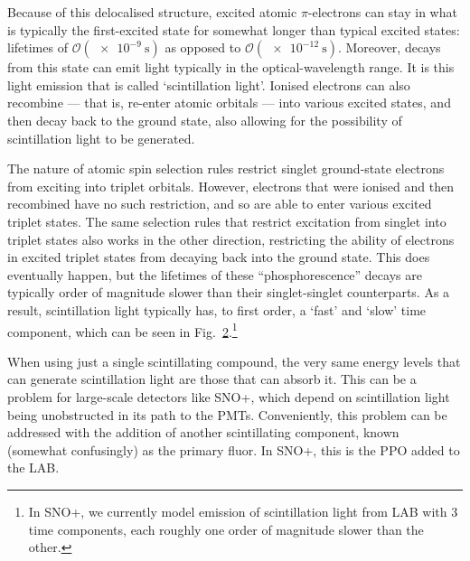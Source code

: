 \begin{figure}
    \centering
    \caption[]{}
    \label{fig:benzene_pi_bonds}
\end{figure}

Because of this delocalised structure, excited atomic $\pi$-electrons can stay in what is typically the first-excited state for somewhat longer than typical excited states: lifetimes of $\mathcal{O}(\SI{e-9}{\second})$ as opposed to $\mathcal{O}(\SI{e-12}{\second})$. Moreover, decays from this state can emit light typically in the optical-wavelength range. It is this light emission that is called `scintillation light'. Ionised electrons can also recombine --- that is, re-enter atomic orbitals --- into various excited states, and then decay back to the ground state, also allowing for the possibility of scintillation light to be generated.

The nature of atomic spin selection rules restrict singlet ground-state electrons from exciting into triplet orbitals. However, electrons that were ionised and then recombined have no such restriction, and so are able to enter various excited triplet states. The same selection rules that restrict excitation from singlet into triplet states also works in the other direction, restricting the ability of electrons in excited triplet states from decaying back into the ground state. This does eventually happen, but the lifetimes of these ``phosphorescence'' decays are typically order of magnitude slower than their singlet-singlet counterparts. As a result, scintillation light typically has, to first order, a `fast' and `slow' time component, which can be seen in Fig.~\ref{fig:typical_tres_dist_physics}.\footnote{In SNO+, we currently model emission of scintillation light from LAB with 3 time components, each roughly one order of magnitude slower than the other.}

\begin{figure}
    \centering
    \caption[]{}
    \label{fig:typical_tres_dist_physics}
\end{figure}

When using just a single scintillating compound, the very same energy levels that can generate scintillation light are those that can absorb it. This can be a problem for large-scale detectors like SNO+, which depend on scintillation light being unobstructed in its path to the PMTs. Conveniently, this problem can be addressed with the addition of another scintillating component, known (somewhat confusingly) as the primary fluor. In SNO+, this is the PPO added to the LAB.

